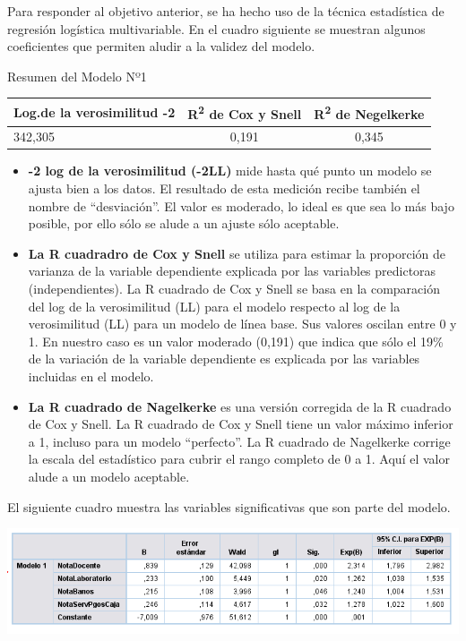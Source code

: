 \documentclass[]{book}
\begin{document}
Para responder al objetivo anterior, se ha hecho uso de la técnica
estadística de regresión logística multivariable. En el cuadro siguiente
se muestran algunos coeficientes que permiten aludir a la validez del
modelo.

Resumen del Modelo Nº1

\begin{longtable}[]{@{}lcc@{}}
\toprule
Log.de la verosimilitud -2 & R\textsuperscript{2} de Cox y Snell &
R\textsuperscript{2} de Negelkerke\tabularnewline
\midrule
\endhead
342,305 & 0,191 & 0,345\tabularnewline
\bottomrule
\end{longtable}

\begin{itemize}
\item
  \textbf{-2 log de la verosimilitud (-2LL)} mide hasta qué punto un
  modelo se ajusta bien a los datos. El resultado de esta medición
  recibe también el nombre de ``desviación''. El valor es moderado, lo
  ideal es que sea lo más bajo posible, por ello sólo se alude a un
  ajuste sólo aceptable.
\item
  \textbf{La R cuadradro de Cox y Snell} se utiliza para estimar la
  proporción de varianza de la variable dependiente explicada por las
  variables predictoras (independientes). La R cuadrado de Cox y Snell
  se basa en la comparación del log de la verosimilitud (LL) para el
  modelo respecto al log de la verosimilitud (LL) para un modelo de
  línea base. Sus valores oscilan entre 0 y 1. En nuestro caso es un
  valor moderado (0,191) que indica que sólo el 19\% de la variación de
  la variable dependiente es explicada por las variables incluidas en el
  modelo.
\item
  \textbf{La R cuadrado de Nagelkerke} es una versión corregida de la R
  cuadrado de Cox y Snell. La R cuadrado de Cox y Snell tiene un valor
  máximo inferior a 1, incluso para un modelo ``perfecto''. La R
  cuadrado de Nagelkerke corrige la escala del estadístico para cubrir
  el rango completo de 0 a 1. Aquí el valor alude a un modelo aceptable.
\end{itemize}

El siguiente cuadro muestra las variables significativas que son parte
del modelo.

\begin{center}\includegraphics{images/Modelo1} \end{center}
\end{document}
